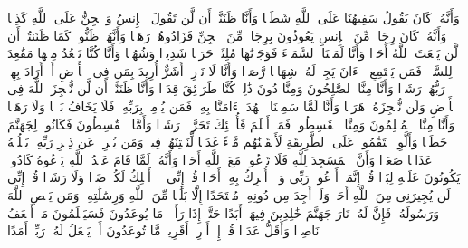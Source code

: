 \startbuffer[\q:72:4]
وَأَنَّهُۥ كَانَ یَقُولُ سَفِیهُنَا عَلَى ٱللَّهِ شَطَطࣰا%
\stopbuffer
\startbuffer[\q:72:5]
وَأَنَّا ظَنَنَّاۤ أَن لَّن تَقُولَ ٱلۡإِنسُ وَٱلۡجِنُّ عَلَى ٱللَّهِ كَذِبࣰا%
\stopbuffer
\startbuffer[\q:72:6]
وَأَنَّهُۥ كَانَ رِجَالࣱ مِّنَ ٱلۡإِنسِ یَعُوذُونَ بِرِجَالࣲ مِّنَ ٱلۡجِنِّ فَزَادُوهُمۡ رَهَقࣰا%
\stopbuffer
\startbuffer[\q:72:7]
وَأَنَّهُمۡ ظَنُّوا۟ كَمَا ظَنَنتُمۡ أَن لَّن یَبۡعَثَ ٱللَّهُ أَحَدࣰا%
\stopbuffer
\startbuffer[\q:72:8]
وَأَنَّا لَمَسۡنَا ٱلسَّمَاۤءَ فَوَجَدۡنَٰهَا مُلِئَتۡ حَرَسࣰا شَدِیدࣰا وَشُهُبࣰا%
\stopbuffer
\startbuffer[\q:72:9]
وَأَنَّا كُنَّا نَقۡعُدُ مِنۡهَا مَقَٰعِدَ لِلسَّمۡعِۖ فَمَن یَسۡتَمِعِ ٱلۡءَانَ یَجِدۡ لَهُۥ شِهَابࣰا رَّصَدࣰا%
\stopbuffer
\startbuffer[\q:72:10]
وَأَنَّا لَا نَدۡرِیۤ أَشَرٌّ أُرِیدَ بِمَن فِی ٱلۡأَرۡضِ أَمۡ أَرَادَ بِهِمۡ رَبُّهُمۡ رَشَدࣰا%
\stopbuffer
\startbuffer[\q:72:11]
وَأَنَّا مِنَّا ٱلصَّٰلِحُونَ وَمِنَّا دُونَ ذَٰلِكَۖ كُنَّا طَرَاۤئِقَ قِدَدࣰا%
\stopbuffer
\startbuffer[\q:72:12]
وَأَنَّا ظَنَنَّاۤ أَن لَّن نُّعۡجِزَ ٱللَّهَ فِی ٱلۡأَرۡضِ وَلَن نُّعۡجِزَهُۥ هَرَبࣰا%
\stopbuffer
\startbuffer[\q:72:13]
وَأَنَّا لَمَّا سَمِعۡنَا ٱلۡهُدَىٰۤ ءَامَنَّا بِهِۦۖ فَمَن یُؤۡمِنۢ بِرَبِّهِۦ فَلَا یَخَافُ بَخۡسࣰا وَلَا رَهَقࣰا%
\stopbuffer
\startbuffer[\q:72:14]
وَأَنَّا مِنَّا ٱلۡمُسۡلِمُونَ وَمِنَّا ٱلۡقَٰسِطُونَۖ فَمَنۡ أَسۡلَمَ فَأُو۟لَٰۤئِكَ تَحَرَّوۡا۟ رَشَدࣰا%
\stopbuffer
\startbuffer[\q:72:15]
وَأَمَّا ٱلۡقَٰسِطُونَ فَكَانُوا۟ لِجَهَنَّمَ حَطَبࣰا%
\stopbuffer
\startbuffer[\q:72:16]
وَأَلَّوِ ٱسۡتَقَٰمُوا۟ عَلَى ٱلطَّرِیقَةِ لَأَسۡقَیۡنَٰهُم مَّاۤءً غَدَقࣰا%
\stopbuffer
\startbuffer[\q:72:17]
لِّنَفۡتِنَهُمۡ فِیهِۚ وَمَن یُعۡرِضۡ عَن ذِكۡرِ رَبِّهِۦ یَسۡلُكۡهُ عَذَابࣰا صَعَدࣰا%
\stopbuffer
\startbuffer[\q:72:18]
وَأَنَّ ٱلۡمَسَٰجِدَ لِلَّهِ فَلَا تَدۡعُوا۟ مَعَ ٱللَّهِ أَحَدࣰا%
\stopbuffer
\startbuffer[\q:72:19]
وَأَنَّهُۥ لَمَّا قَامَ عَبۡدُ ٱللَّهِ یَدۡعُوهُ كَادُوا۟ یَكُونُونَ عَلَیۡهِ لِبَدࣰا%
\stopbuffer
\startbuffer[\q:72:20]
قُلۡ إِنَّمَاۤ أَدۡعُوا۟ رَبِّی وَلَاۤ أُشۡرِكُ بِهِۦۤ أَحَدࣰا%
\stopbuffer
\startbuffer[\q:72:21]
قُلۡ إِنِّی لَاۤ أَمۡلِكُ لَكُمۡ ضَرࣰّا وَلَا رَشَدࣰا%
\stopbuffer
\startbuffer[\q:72:22]
قُلۡ إِنِّی لَن یُجِیرَنِی مِنَ ٱللَّهِ أَحَدࣱ وَلَنۡ أَجِدَ مِن دُونِهِۦ مُلۡتَحَدًا%
\stopbuffer
\startbuffer[\q:72:23]
إِلَّا بَلَٰغࣰا مِّنَ ٱللَّهِ وَرِسَٰلَٰتِهِۦۚ وَمَن یَعۡصِ ٱللَّهَ وَرَسُولَهُۥ فَإِنَّ لَهُۥ نَارَ جَهَنَّمَ خَٰلِدِینَ فِیهَاۤ أَبَدًا%
\stopbuffer
\startbuffer[\q:72:24]
حَتَّىٰۤ إِذَا رَأَوۡا۟ مَا یُوعَدُونَ فَسَیَعۡلَمُونَ مَنۡ أَضۡعَفُ نَاصِرࣰا وَأَقَلُّ عَدَدࣰا%
\stopbuffer
\startbuffer[\q:72:25]
قُلۡ إِنۡ أَدۡرِیۤ أَقَرِیبࣱ مَّا تُوعَدُونَ أَمۡ یَجۡعَلُ لَهُۥ رَبِّیۤ أَمَدًا%
